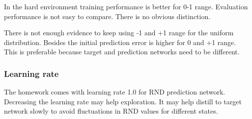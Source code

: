 \documentclass[11pt]{article}
\begin{document}
    In the hard environment training performance is better for 0-1 range.
    Evaluation performance is not easy to compare.
    There is no obvious distinction.

    There is not enough evidence to keep using -1 and +1 range for the uniform distribution.
    Besides the initial prediction error is higher for 0 and +1 range.
    This is preferable because target and prediction networks need to be different.

    \subsubsection{Learning rate}

    The homework comes with learning rate 1.0 for RND prediction network.
    Decreasing the learning rate may help exploration.
    It may help distill to target network slowly to avoid fluctuations in RND values for different states.
\end{document}
